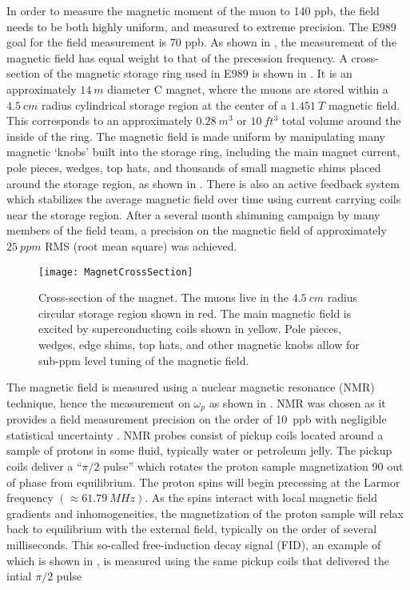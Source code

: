 In order to measure the magnetic moment of the muon to 140 ppb, the field needs to be both highly uniform, and measured to extreme precision. The E989 goal for the field measurement is 70 ppb. As shown in , the measurement of the magnetic field has equal weight to that of the precession frequency. A cross-section of the magnetic storage ring used in E989 is shown in . It is an approximately $\SI{14}{m}$ diameter C magnet, where the muons are stored within a $\SI{4.5}{cm}$ radius cylindrical storage region at the center of a $\SI{1.451}{T}$ magnetic field. This corresponds to an approximately $\SI{0.28}{m^{3}}$ or $\SI{10}{ft^{3}}$ total volume around the inside of the ring. The magnetic field is made uniform by manipulating many magnetic `knobs' built into the \gmtwo storage ring, including the main magnet current, pole pieces, wedges, top hats, and thousands of small magnetic shims placed around the storage region, as shown in . There is also an active feedback system which stabilizes the average magnetic field over time using current carrying coils near the storage region. After a several month shimming campaign by many members of the field team, a precision on the magnetic field of approximately $\SI{25}{ppm}$ RMS (root mean square) was achieved.

\begin{figure}
    \centering
    \texttt{[image: MagnetCrossSection]}
    \caption[Magnet cross section]{Cross-section of the \gmtwo magnet. The muons live in the $\SI{4.5}{cm}$ radius circular storage region shown in red. The main magnetic field is excited by superconducting coils shown in yellow. Pole pieces, wedges, edge shims, top hats, and other magnetic knobs allow for sub-ppm level tuning of the magnetic field.}
    \label{fig:MagnetCrossSection}
\end{figure}


The magnetic field is measured using a nuclear magnetic resonance (NMR) technique, hence the measurement on $\omega_{p}$ as shown in . NMR was chosen as it provides a field measurement precision on the order of \SI{10}{ppb} with negligible statistical uncertainty \cite{TDR}. NMR probes consist of pickup coils located around a sample of protons in some fluid, typically water or petroleum jelly. The pickup coils deliver a ``$\pi/2$ pulse'' which rotates the proton sample magnetization 90\textdegree{} out of phase from equilibrium. The proton spins will begin precessing at the Larmor frequency $(\approx \SI{61.79}{MHz})$. As the spins interact with local magnetic field gradients and inhomogeneities, the magnetization of the proton sample will relax back to equilibrium with the external field, typically on the order of several milliseconds. This so-called free-induction decay signal (FID), an example of which is shown in , is measured using the same pickup coils that delivered the intial $\pi/2$ pulse



